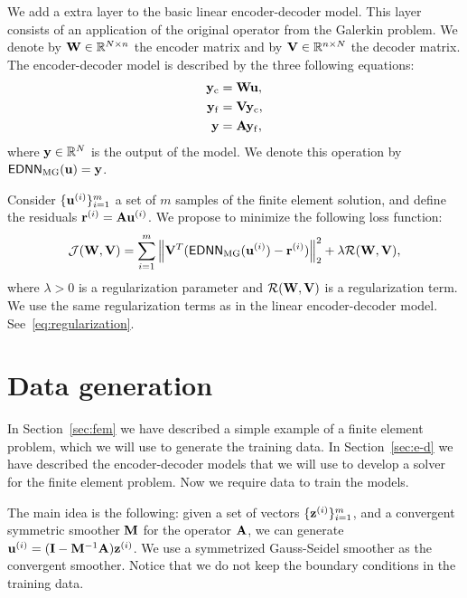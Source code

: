 We add a extra layer to the basic linear encoder-decoder model.
This layer consists of an application of the original operator from the Galerkin problem.
We denote by \(\mathbf{W} \in \mathbb{R}^{N \times n}\) the encoder matrix and by \(\mathbf{V} \in \mathbb{R}^{n \times N}\) the decoder matrix.
The encoder-decoder model is described by the three following equations:
\begin{subequations}
    \begin{align}
        \mathbf{y}_\mathrm{c} & = \mathbf{W} \mathbf{u}, \\
        \mathbf{y}_\mathrm{f} & = \mathbf{V} \mathbf{y}_\mathrm{c}, \\
        \mathbf{y} & = \mathbf{A} \mathbf{y}_\mathrm{f},
    \end{align}
\end{subequations}
where \(\mathbf{y} \in \mathbb{R}^{N}\) is the output of the model.
We denote this operation by \(\mathsf{EDNN}_\mathrm{MG}(\mathbf{u}) = \mathbf{y}\).

Consider \( \{ \mathbf{u}^{(i)} \}_{i=1}^{m} \) a set of \(m\) samples of the finite element solution, and define the residuals \(\mathbf{r}^{(i)} = \mathbf{A} \mathbf{u}^{(i)}\).
We propose to minimize the following loss function:
\begin{equation}
    \mathcal{J}(\mathbf{W}, \mathbf{V}) =
    \sum_{i=1}^{m} \left\lVert \mathbf{V}^T( \mathsf{EDNN}_\mathrm{MG}(\mathbf{u}^{(i)}) - \mathbf{r}^{(i)} )  \right\rVert_2^2 +
    \lambda \mathcal{R}(\mathbf{W}, \mathbf{V}),
\end{equation}
where \(\lambda > 0\) is a regularization parameter and \(\mathcal{R}(\mathbf{W}, \mathbf{V})\) is a regularization term.
We use the same regularization terms as in the linear encoder-decoder model.
See~\eqref{eq:regularization}.

\section{Data generation}
\label{sec:data}

In Section~\ref{sec:fem} we have described a simple example of a finite element problem, which we will use to generate the training data.
In Section~\ref{sec:e-d} we have described the encoder-decoder models that we will use to develop a solver for the finite element problem.
Now we require data to train the models.

The main idea is the following: given a set of vectors \( \{ \mathbf{z}^{(i)} \}_{i=1}^{m} \), and a convergent symmetric smoother \( \mathbf{M}\) for the operator \(\mathbf{A}\), we can generate \( \mathbf{u}^{(i)} = (\mathbf{I} - \mathbf{M}^{-1} \mathbf{A}) \mathbf{z}^{(i)} \).
We use a symmetrized Gauss-Seidel smoother as the convergent smoother.
Notice that we do not keep the boundary conditions in the training data.

